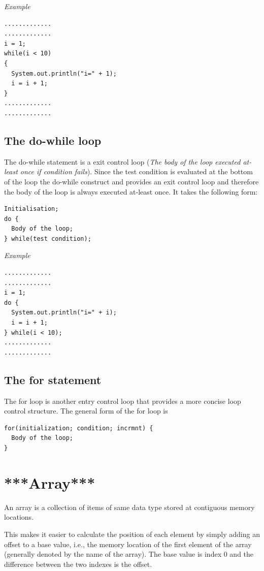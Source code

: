 \documentclass[twocolumn, a4paper]{article}
\begin{document}
\vskip10pt
\noindent\textit{Example}
\begin{lstlisting}
.............
.............
i = 1;
while(i < 10)
{
  System.out.println("i=" + 1);
  i = i + 1;
}
.............
.............
\end{lstlisting}


\subsection{The do-while loop}
The do-while statement is a exit control loop (\textit{The body of the loop
executed at-least once if condition fails}). Since the test condition is
evaluated at the bottom of the loop the do-while construct and provides an
exit control loop and therefore the body of the loop is always executed
at-least once. It takes the following form:

\begin{lstlisting}
Initialisation;
do {
  Body of the loop;
} while(test condition);
\end{lstlisting}

\vskip20pt
\noindent\textit{Example}
\begin{lstlisting}
.............
.............
i = 1;
do {
  System.out.println("i=" + i);
  i = i + 1;
} while(i < 10);
.............
.............
\end{lstlisting}

\subsection{The for statement}
The for loop is another entry control loop that provides a more concise loop
control structure. The general form of the for loop is
\begin{lstlisting}
for(initialization; condition; incrmnt) {
  Body of the loop;
}
\end{lstlisting}

\section{***Array***}
An array is a collection of items of same data type stored at contiguous
memory locations.

This makes it easier to calculate the position of each element by simply adding
an offset to a base value, i.e., the memory location of the first element of
the array (generally denoted by the name of the array). The base value is index
0 and the difference between the two indexes is the offset.
\end{document}
